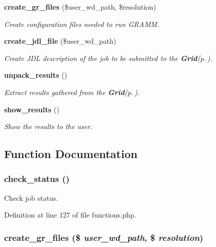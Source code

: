 \begin{CompactItemize}
{\bf create\_\-gr\_\-files} (\$user\_\-wd\_\-path, \$resolution)
\begin{CompactList}\small\item\em Create configuration files needed to run GRAMM. \item\end{CompactList}\item 
{\bf create\_\-jdl\_\-file} (\$user\_\-wd\_\-path)
\begin{CompactList}\small\item\em Create JDL description of the job to be submitted to the {\bf Grid}{\rm (p.\,\pageref{classGrid})}. \item\end{CompactList}\item 
{\bf unpack\_\-results} ()
\begin{CompactList}\small\item\em Extract results gathered from the {\bf Grid}{\rm (p.\,\pageref{classGrid})}. \item\end{CompactList}\item 
{\bf show\_\-results} ()
\begin{CompactList}\small\item\em Show the results to the user. \item\end{CompactList}\end{CompactItemize}


\subsection{Function Documentation}
\subsubsection{\setlength{\rightskip}{0pt plus 5cm}check\_\-status ()}\label{functions_8php_a3}


Check job status. 



Definition at line 127 of file functions.php.
\subsubsection{\setlength{\rightskip}{0pt plus 5cm}create\_\-gr\_\-files (\$ {\em user\_\-wd\_\-path}, \$ {\em resolution})}\label{functions_8php_a5}


